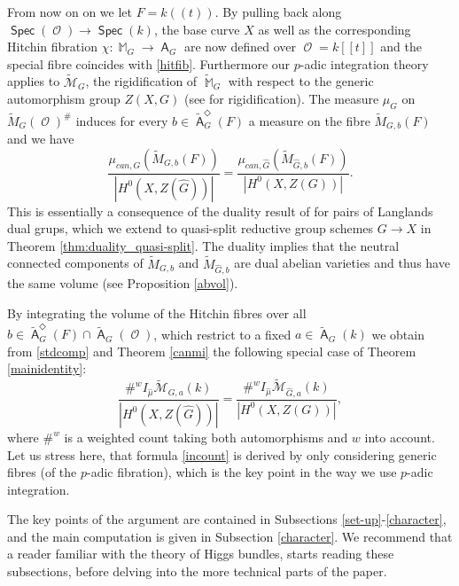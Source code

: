 \documentclass{article}
\DeclareMathOperator{\A}{\mathsf{A}}
\DeclareMathOperator{\Mb}{\mathbb{M}}
\newcommand{\Mc}{\mathcal{M}}
\DeclareMathOperator{\Spec}{\mathsf{Spec}}
\DeclareMathOperator{\Oo}{\mathcal{O}}
\newcommand{\FA}{\A}
\theoremstyle{definition}
\theoremstyle{plain}
\begin{document}
From now on on we let $F=k((t))$. By pulling back along $\Spec(\Oo) \to \Spec(k)$, the base curve $X$ as well as the corresponding Hitchin fibration $\chi: \Mb_G \to \FA_G $ are now defined over $\Oo = k[[t]]$ and the special fibre coincides with \eqref{hitfib}. Furthermore our $p$-adic integration theory applies to $\widetilde{\Mc}_G$, the rigidification of $\widetilde{\Mb}_G$ with respect to the generic automorphism group $Z(X,G)$ (see \cite[Theorem 5.1.5]{abramovich2003twisted} for rigidification). The measure $\mu_{G}$ on $\widetilde{M}_G(\Oo)^\#$ induces for every $b \in \widetilde{\FA}^\Diamond_G(F)$ a measure on the fibre $\widetilde{M}_{G,b}(F)$ and we have
\begin{equation}\label{stdcomp}  \frac{\mu_{can,G}\left(\widetilde{M}_{G,b}(F)\right)}{|H^0(X,Z(\widehat{G}))| } = \frac{\mu_{can,\widehat{G}}\left(\widetilde{M}_{\widehat{G},b}(F)\right)}{|H^0(X,Z(G))|}.\end{equation}
This is essentially a consequence of the duality result of \cite{MR2957305,chenzhu} for pairs of Langlands dual grups, which we extend to quasi-split reductive group schemes $G \to X$ in Theorem \ref{thm:duality_quasi-split}. The duality implies that the neutral connected components of $\widetilde{M}_{G,b}$ and $\widetilde{M}_{\widehat{G},b}$ are dual abelian varieties and thus have the same volume (see Proposition \ref{abvol}). 

By integrating the volume of the Hitchin fibres over all $b \in \widetilde{\FA}^\Diamond_G(F) \cap \widetilde{\FA}_G(\Oo)$, which restrict to a fixed $a \in \widetilde{\FA}_G(k)$ we obtain from \eqref{stdcomp} and Theorem \ref{canmi} the following special case of Theorem \ref{mainidentity}:
\begin{equation}\label{incount} \frac{\#^w I_{\widehat{\mu}}\widetilde{\Mc}_{G,a}(k)}{{|H^0(X,Z(\widehat{G}))| }} = \frac{\#^w I_{\widehat{\mu}}\widetilde{\Mc}_{\widehat{G},a}(k)}{{|H^0(X,Z(G))|}},  \end{equation}
where $\#^w$ is a weighted count taking both automorphisms and $w$ into account. Let us stress here, that formula \eqref{incount} is derived by only considering generic fibres (of the $p$-adic fibration), which is the key point in the way we use $p$-adic integration.

The key points of the argument are contained in Subsections \ref{set-up}-\ref{character}, and the main computation is given in Subsection \ref{character}. We recommend that a reader familiar with the theory of Higgs bundles, starts reading these subsections, before delving into the more technical parts of the paper.
\end{document}

